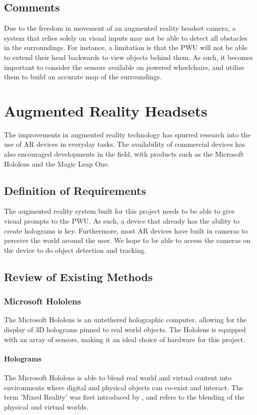 \subsection{Comments}
Due to the freedom in movement of an augmented reality headset camera, a system that relies solely on visual inputs may not be able to detect all obstacles in the surroundings. For instance, a limitation is that the PWU will not be able to extend their head backwards to view objects behind them. As such, it becomes important to consider the sensors available on powered wheelchairs, and utilize them to build an accurate map of the surroundings.

\section{Augmented Reality Headsets}
The improvements in augmented reality technology has spurred research into the use of AR devices in everyday tasks. The availability of commercial devices has also encouraged developments in the field, with products such as the Microsoft Hololens and the Magic Leap One.

\subsection{Definition of Requirements}
The augmented reality system built for this project needs to be able to give visual prompts to the PWU. As such, a device that already has the ability to create holograms is key. Furthermore, most AR devices have built in cameras to perceive the world around the user. We hope to be able to access the cameras on the device to do object detection and tracking.

\subsection{Review of Existing Methods}

\subsubsection{Microsoft Hololens}
The Microsoft Hololens is an untethered holographic computer, allowing for the display of 3D holograms pinned to real world objects. The Hololens is equipped with an array of sensors, making it an ideal choice of hardware for this project.

\paragraph{Holograms}The Microsoft Hololens is able to blend real world and virtual content into environments where digital and physical objects can co-exist and interact. The term 'Mixed Reality' was first introduced by \cite{Milgram1994}, and refers to the blending of the physical and virtual worlds.

